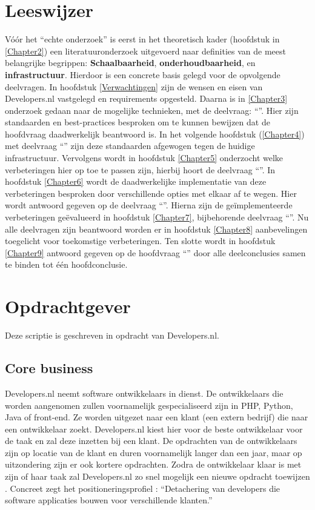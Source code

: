 \section{Leeswijzer}

Vóór het \enquote{echte onderzoek} is eerst in het theoretisch kader (hoofdstuk in \ref{Chapter2}) een literatuuronderzoek uitgevoerd naar definities van de meest belangrijke begrippen: \textbf{Schaalbaarheid}, \textbf{onderhoudbaarheid}, en \textbf{infrastructuur}. Hierdoor is een concrete basis gelegd voor de opvolgende deelvragen. In hoofdstuk \ref{Verwachtingen} zijn de wensen en eisen van Developers.nl vastgelegd en requirements opgesteld. Daarna is in \ref{Chapter3} onderzoek gedaan naar de mogelijke technieken, met de deelvraag: \enquote{\deeltechnieken}. Hier zijn standaarden en best-practices besproken om te kunnen bewijzen dat de hoofdvraag daadwerkelijk beantwoord is. In het volgende hoofdstuk (\ref{Chapter4}) met deelvraag \enquote{\deelhuidig} zijn deze standaarden afgewogen tegen de huidige infrastructuur. Vervolgens wordt in hoofdstuk \ref{Chapter5} onderzocht welke verbeteringen hier op toe te passen zijn, hierbij hoort de deelvraag \enquote{\deelverbetering}. In hoofdstuk \ref{Chapter6} wordt de daadwerkelijke implementatie van deze verbeteringen besproken door verschillende opties met elkaar af te wegen. Hier wordt antwoord gegeven op de deelvraag \enquote{\deelverbetering}. Hierna zijn de geïmplementeerde verbeteringen geëvalueerd in hoofdstuk \ref{Chapter7}, bijbehorende deelvraag \enquote{\deelrequirements}. Nu alle deelvragen zijn beantwoord worden er in hoofdstuk \ref{Chapter8} aanbevelingen toegelicht voor toekomstige verbeteringen. Ten slotte wordt in hoofdstuk \ref{Chapter9} antwoord gegeven op de hoofdvraag \enquote{\hoofdvraagname} door alle deelconclusies samen te binden tot één hoofdconclusie.

\section{Opdrachtgever}

Deze scriptie is geschreven in opdracht van Developers.nl.

\subsection{Core business}
Developers.nl neemt software ontwikkelaars in dienst. De ontwikkelaars die worden aangenomen zullen voornamelijk gespecialiseerd zijn in PHP, Python, Java of front-end. Ze worden uitgezet naar een klant (een extern bedrijf) die naar een ontwikkelaar zoekt. Developers.nl kiest hier voor de beste ontwikkelaar voor de taak en zal deze inzetten bij een klant. De opdrachten van de ontwikkelaars zijn op locatie van de klant en duren voornamelijk langer dan een jaar, maar op uitzondering zijn er ook kortere opdrachten. Zodra de ontwikkelaar klaar is met zijn of haar taak zal Developers.nl zo snel mogelijk een nieuwe opdracht toewijzen \parencite{Stageplan}. Concreet zegt het positioneringsprofiel \parencite{Positioneringsprofiel}: \enquote{Detachering van developers die software applicaties bouwen voor verschillende klanten.}

